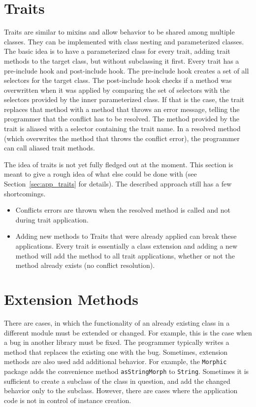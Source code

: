 \section{Traits}
Traits are similar to mixins and allow behavior to be shared among multiple classes. They can be implemented with class nesting and parameterized classes. The basic idea is to have a parameterized class for every trait, adding trait methods to the target class, but without subclassing it first. Every trait has a pre-include hook and post-include hook. The pre-include hook creates a set of all selectors for the target class. The post-include hook checks if a method was overwritten when it was applied by comparing the set of selectors with the selectors provided by the inner parameterized class. If that is the case, the trait replaces that method with a method that throws an error message, telling the programmer that the conflict has to be resolved. The method provided by the trait is aliased with a selector containing the trait name. In a resolved method (which overwrites the method that throws the conflict error), the programmer can call aliased trait methods.

The idea of traits is not yet fully fledged out at the moment. This section is meant to give a rough idea of what else could be done with \msname (see Section~\ref{sec:app_traits} for details). The described approach still has a few shortcomings.
\begin{itemize}
    \item Conflicts errors are thrown when the resolved method is called and not during trait application.
    \item Adding new methods to Traits that were already applied can break these applications. Every trait is essentially a class extension and adding a new method will add the method to all trait applications, whether or not the method already exists (no conflict resolution).
\end{itemize}

\section{Extension Methods}
\label{sec:usecases_ext_meth}
There are cases, in which the functionality of an already existing class in a different module must be extended or changed. For example, this is the case when a bug in another library must be fixed. The programmer typically writes a method that replaces the existing one with the bug. Sometimes, extension methods are also used add additional behavior. For example, the \texttt{Morphic} package adds the convenience method \texttt{asStringMorph} to \texttt{String}. Sometimes it is sufficient to create a subclass of the class in question, and add the changed behavior only to the subclass. However, there are cases where the application code is not in control of instance creation.

